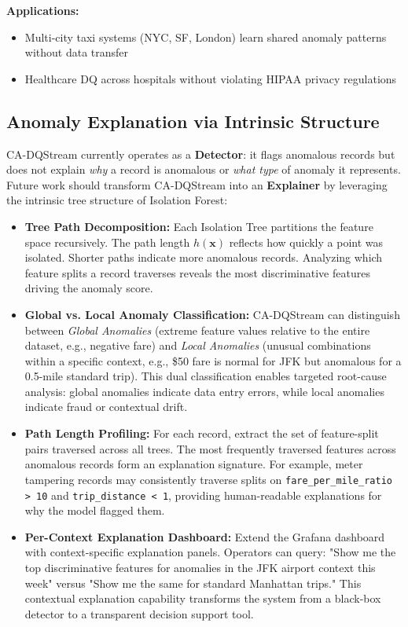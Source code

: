 \textbf{Applications:}
\begin{itemize}
    \item Multi-city taxi systems (NYC, SF, London) learn shared anomaly patterns without data transfer
    \item Healthcare DQ across hospitals without violating HIPAA privacy regulations
\end{itemize}

\subsection{Anomaly Explanation via Intrinsic Structure}

CA-DQStream currently operates as a \textbf{Detector}: it flags anomalous records but does not explain \emph{why} a record is anomalous or \emph{what type} of anomaly it represents. Future work should transform CA-DQStream into an \textbf{Explainer} by leveraging the intrinsic tree structure of Isolation Forest:

\begin{itemize}
    \item \textbf{Tree Path Decomposition:} Each Isolation Tree partitions the feature space recursively. The path length $h(\mathbf{x})$ reflects how quickly a point was isolated. Shorter paths indicate more anomalous records. Analyzing which feature splits a record traverses reveals the most discriminative features driving the anomaly score.

    \item \textbf{Global vs. Local Anomaly Classification:} CA-DQStream can distinguish between \emph{Global Anomalies} (extreme feature values relative to the entire dataset, e.g., negative fare) and \emph{Local Anomalies} (unusual combinations within a specific context, e.g., \$50 fare is normal for JFK but anomalous for a 0.5-mile standard trip). This dual classification enables targeted root-cause analysis: global anomalies indicate data entry errors, while local anomalies indicate fraud or contextual drift.

    \item \textbf{Path Length Profiling:} For each record, extract the set of feature-split pairs traversed across all trees. The most frequently traversed features across anomalous records form an explanation signature. For example, meter tampering records may consistently traverse splits on \texttt{fare\_per\_mile\_ratio > 10} and \texttt{trip\_distance < 1}, providing human-readable explanations for why the model flagged them.

    \item \textbf{Per-Context Explanation Dashboard:} Extend the Grafana dashboard with context-specific explanation panels. Operators can query: "Show me the top discriminative features for anomalies in the JFK airport context this week" versus "Show me the same for standard Manhattan trips." This contextual explanation capability transforms the system from a black-box detector to a transparent decision support tool.
\end{itemize}

